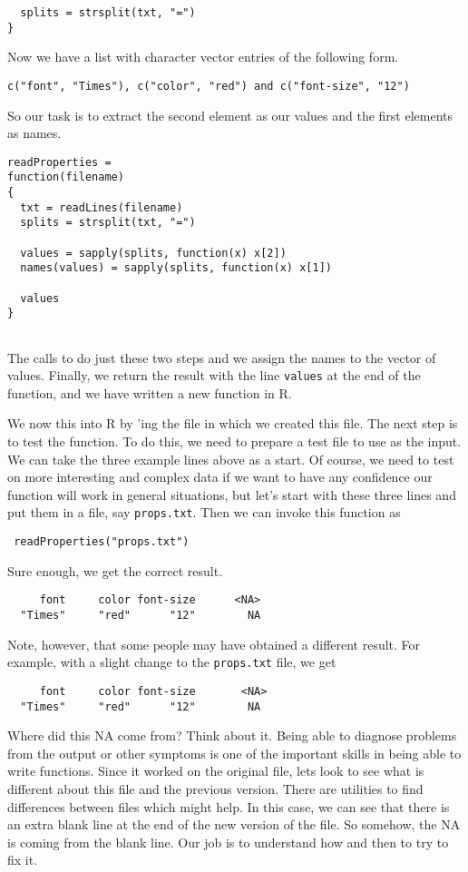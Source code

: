 {\begin{verbatim}
  splits = strsplit(txt, "=")
}
\end{verbatim}
Now we have a list with character vector entries of the following form.
\begin{verbatim}
c("font", "Times"), c("color", "red") and c("font-size", "12")
\end{verbatim} 
So our task is to extract the second element as our values and the
first elements as names.
\begin{verbatim}
readProperties =
function(filename) 
{
  txt = readLines(filename)
  splits = strsplit(txt, "=")

  values = sapply(splits, function(x) x[2])
  names(values) = sapply(splits, function(x) x[1])

  values
}


\end{verbatim}
The calls to  do just these two steps and we assign
the names to the vector of values. Finally, we return the result
with the line \verb|values| at the end of the function, and we have
written a new function in R.

We now  this into R by 'ing the
file in which we created this file. The next step is to test the
function. To do this, we need to prepare a test file to use as the
input. We can take the three example lines above as a start. Of
course, we need to test on more interesting and complex data if we
want to have any confidence our function will work in general
situations, but let's start with these three lines and put them in a
file, say {\texttt{props.txt}}. Then we can invoke this function as
\begin{verbatim}
 readProperties("props.txt")
\end{verbatim}
Sure enough, we get the correct result. 
\begin{verbatim}
     font     color font-size      <NA> 
  "Times"     "red"      "12"        NA 
\end{verbatim}

Note, however, that some people may have obtained a different
result. For example, with a slight change to the {\texttt{props.txt}}
file, we get
\begin{verbatim}
     font     color font-size       <NA> 
  "Times"     "red"      "12"        NA 
\end{verbatim}
Where did this NA come from? Think about it. Being able to diagnose
problems from the output or other symptoms is one of the important
skills in being able to write functions. Since it worked on the
original file, lets look to see what is different about this file and
the previous version. There are utilities to find differences between
files which might help. In this case, we can see that there is an
extra blank line at the end of the new version of the file. So
somehow, the NA is coming from the blank line. Our job is to
understand how and then to try to fix it.

}
